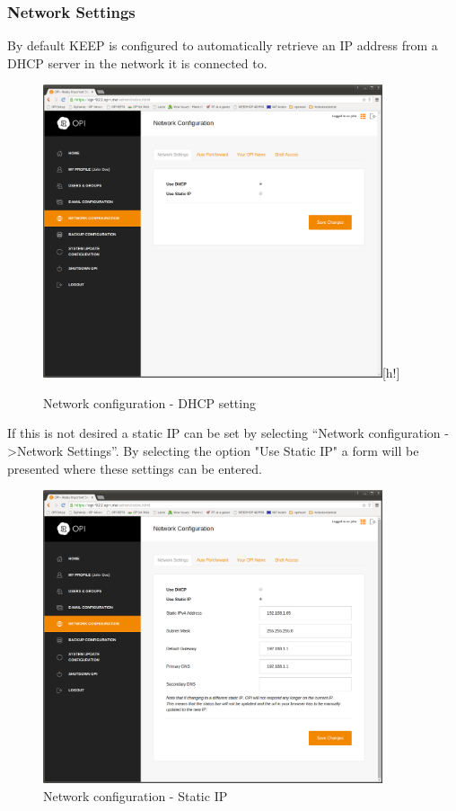 \documentclass[12pt,a4paper,titlepage]{article}
\begin{document}
\subsubsection{Network Settings}
By default KEEP is configured to automatically retrieve an IP address from a DHCP server in the network it is connected to.
\begin{figure}[h!]
\centering
\includegraphics[width=10cm]{./img/network-config-dhcp}[h!]
\caption{Network configuration - DHCP setting}
\end{figure}
If this is not desired a static IP can be set by selecting ``Network configuration -\textgreater Network Settings''. By selecting the option "Use Static IP" a form will be presented where these settings can be entered.
\begin{figure}[h!]
\centering
\includegraphics[width=10cm]{./img/network-config-static}
\caption{Network configuration - Static IP}
\end{figure}
\FloatBarrier
\end{document}
